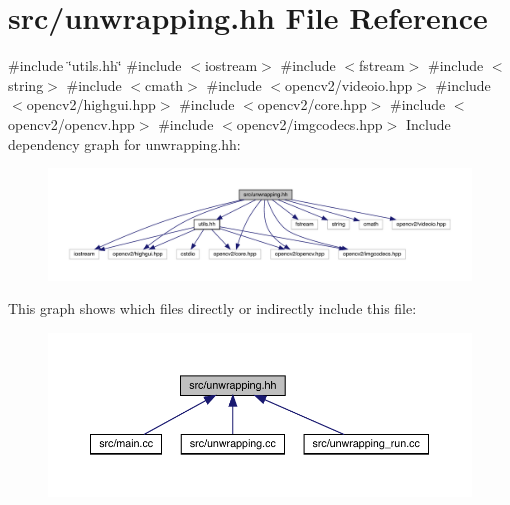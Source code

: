 \hypertarget{unwrapping_8hh}{}\section{src/unwrapping.hh File Reference}
\label{unwrapping_8hh}
{\ttfamily \#include \char`\"{}utils.\+hh\char`\"{}}\newline
{\ttfamily \#include $<$iostream$>$}\newline
{\ttfamily \#include $<$fstream$>$}\newline
{\ttfamily \#include $<$string$>$}\newline
{\ttfamily \#include $<$cmath$>$}\newline
{\ttfamily \#include $<$opencv2/videoio.\+hpp$>$}\newline
{\ttfamily \#include $<$opencv2/highgui.\+hpp$>$}\newline
{\ttfamily \#include $<$opencv2/core.\+hpp$>$}\newline
{\ttfamily \#include $<$opencv2/opencv.\+hpp$>$}\newline
{\ttfamily \#include $<$opencv2/imgcodecs.\+hpp$>$}\newline
Include dependency graph for unwrapping.\+hh\+:
\nopagebreak
\begin{figure}[H]
\begin{center}
\leavevmode
\includegraphics[width=350pt]{unwrapping_8hh__incl}
\end{center}
\end{figure}
This graph shows which files directly or indirectly include this file\+:
\nopagebreak
\begin{figure}[H]
\begin{center}
\leavevmode
\includegraphics[width=350pt]{unwrapping_8hh__dep__incl}
\end{center}
\end{figure}
